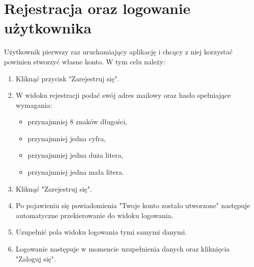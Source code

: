 \documentclass[10pt,twoside,a4paper]{report}
\begin{document}
\section{Rejestracja oraz logowanie użytkownika}
Użytkownik pierwszy raz uruchamiający aplikację i chcący z niej korzystać powinien stworzyć własne konto. W tym celu należy:

\begin{enumerate}
\item Kliknąć przycisk "Zarejestruj się".
\item W widoku rejestracji podać swój adres mailowy oraz hasło spełniające wymagania:
\begin{itemize}
\item przynajmniej 8 znaków długości,
\item przynajmniej jedna cyfra,
\item przynajmniej jedna duża litera,
\item przynajmniej jedna mała litera.
\end{itemize}

\item Kliknąć "Zarejestruj się".
\item Po pojawieniu się powiadomienia "Twoje konto zostało utworzone" następuje automatyczne przekierowanie do widoku logowania.
\item Uzupełnić pola widoku logowania tymi samymi danymi.
\item Logowanie następuje w momencie uzupełnienia danych oraz kliknięcia "Zaloguj się".

\end{enumerate}
\end{document}
